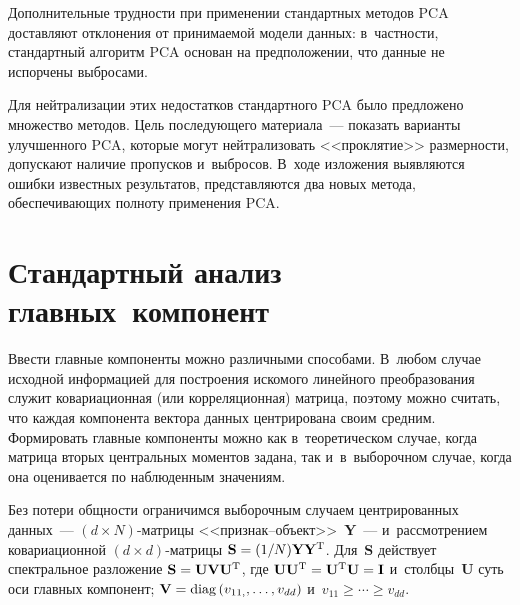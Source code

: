 \begin{multicols}{2}
Дополнительные трудности при применении 
стандартных методов PCA доставляют отклонения от принимаемой модели 
данных: в~частности, стандартный алгоритм PCA основан на предположении, 
что данные не испорчены выбросами. 
     
     Для нейтрализации этих недостатков стандартного PCA было 
предложено множество методов. Цель последующего материала~--- показать 
варианты улучшенного PCA, которые могут нейтрализовать <<проклятие>> 
размерности, допускают наличие пропусков и~выбросов. В~ходе изложения 
выявляются ошибки известных результатов, представляются два новых метода, 
обеспечивающих полноту применения PCA.
     
\section{Стандартный анализ главных~компонент}

     Ввести главные компоненты можно различными способами. В~любом 
случае исходной информацией для построения искомого линейного 
преобра\-зо\-ва\-ния служит ковариационная (или корреляционная) матрица, 
поэтому можно считать, что каждая компонента вектора данных центрирована 
своим средним. Формировать главные компоненты можно как в~теоретическом 
случае, когда мат\-ри\-ца вторых центральных моментов задана, так 
и~в~выборочном случае, когда она оценивается по наблюденным значениям.
     
     Без потери общности ограничимся выборочным случаем центрированных 
данных~--- $(d\times N)$-мат\-ри\-цы <<при\-знак--объ\-ект>>~$\mathbf{Y}$~--- 
и~рассмотрением ковариационной $(d\times d)$-мат\-ри\-цы $\mathbf{S}\hm= 
(1/N)\mathbf{Y}\mathbf{Y}^{\mathrm{T}}$. Для~$\mathbf{S}$ действует 
спектральное разложение $\mathbf{S}\hm= 
\mathbf{U}\mathbf{V}\mathbf{U}^{\mathrm{T}}$, где 
$\mathbf{U}\mathbf{U}^{\mathrm{T}}\hm= 
\mathbf{U}^{\mathrm{T}}\mathbf{U}\hm= \mathbf{I}$ 
и~столбцы~$\mathbf{U}$ суть оси главных компонент; $\mathbf{V}\hm= 
\mathrm{diag}\left( v_{11,},\ldots , v_{dd}\right)$ и~$v_{11}\geq \cdots \geq v_{dd}$.
     

\end{multicols}
